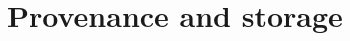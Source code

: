 \documentclass[draftmode,draftwater]{memarticle}
\begin{document}


\section{Provenance and storage}


\end{document}
